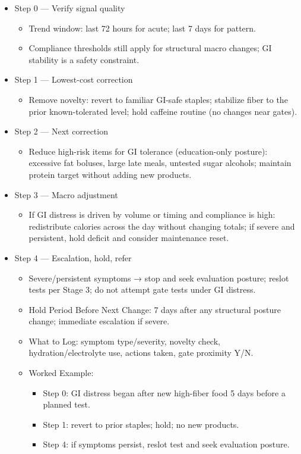 \documentclass[10pt]{article}
\begin{document}
\begin{itemize}
\item Step 0 — Verify signal quality
  \begin{itemize}
  \item Trend window: last 72 hours for acute; last 7 days for pattern.
  \item Compliance thresholds still apply for structural macro changes; GI stability is a safety constraint.
  \end{itemize}
\item Step 1 — Lowest-cost correction
  \begin{itemize}
  \item Remove novelty: revert to familiar GI-safe staples; stabilize fiber to the prior known-tolerated level; hold caffeine routine (no changes near gates).
  \end{itemize}
\item Step 2 — Next correction
  \begin{itemize}
  \item Reduce high-risk items for GI tolerance (education-only posture): excessive fat boluses, large late meals, untested sugar alcohols; maintain protein target without adding new products.
  \end{itemize}
\item Step 3 — Macro adjustment
  \begin{itemize}
  \item If GI distress is driven by volume or timing and compliance is high: redistribute calories across the day without changing totals; if severe and persistent, hold deficit and consider maintenance reset.
  \end{itemize}
\item Step 4 — Escalation, hold, refer
  \begin{itemize}
  \item Severe/persistent symptoms → stop and seek evaluation posture; reslot tests per Stage 3; do not attempt gate tests under GI distress.
  \item Hold Period Before Next Change: 7 days after any structural posture change; immediate escalation if severe.
  \item What to Log: symptom type/severity, novelty check, hydration/electrolyte use, actions taken, gate proximity Y/N.
  \item Worked Example:
    \begin{itemize}
    \item Step 0: GI distress began after new high-fiber food 5 days before a planned test.
    \item Step 1: revert to prior staples; hold; no new products.
    \item Step 4: if symptoms persist, reslot test and seek evaluation posture.
    \end{itemize}
  \end{itemize}
\end{itemize}
\end{document}
